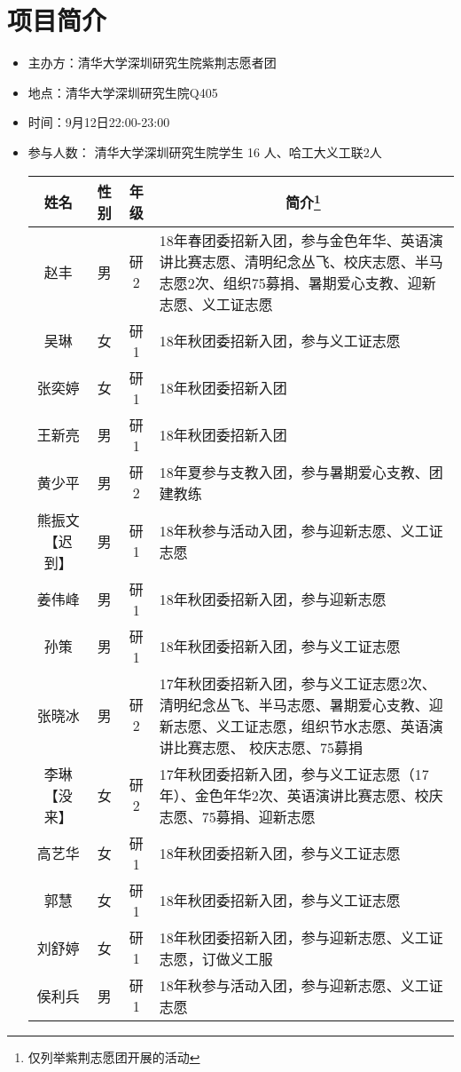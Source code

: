 \documentclass[12pt]{ctexart}
\begin{document}
\section{项目简介}
\begin{itemize}
\item 主办方：清华大学深圳研究生院紫荆志愿者团
\item 地点：清华大学深圳研究生院Q405
\item 时间：9月12日22:00-23:00
\item 参与人数： 清华大学深圳研究生院学生 16 人、哈工大义工联2人
\begin{longtable}{|c|c|c|p{8cm}|}
\hline
姓名 & 性别 & 年级 & \multicolumn{1}{|c|}{简介\footnote{仅列举紫荆志愿团开展的活动}}\\
\hline
赵丰 & 男 & 研2 & 18年春团委招新入团，参与金色年华、英语演讲比赛志愿、清明纪念丛飞、校庆志愿、半马志愿2次、组织75募捐、暑期爱心支教、迎新志愿、义工证志愿\\
\hline
吴琳 & 女 & 研1  & 18年秋团委招新入团，参与义工证志愿\\
\hline
张奕婷 & 女 & 研1 & 18年秋团委招新入团\\
\hline
王新亮 & 男 & 研1 & 18年秋团委招新入团\\
\hline
黄少平 & 男 & 研2 & 18年夏参与支教入团，参与暑期爱心支教、团建教练 \\
\hline
熊振文【迟到】 & 男 & 研1 & 18年秋参与活动入团，参与迎新志愿、义工证志愿 \\
\hline
姜伟峰 & 男 & 研1 & 18年秋团委招新入团，参与迎新志愿 \\
\hline
孙策 & 男 & 研1 & 18年秋团委招新入团，参与义工证志愿 \\
\hline
张晓冰 & 男 & 研2 & 17年秋团委招新入团，参与义工证志愿2次、清明纪念丛飞、半马志愿、暑期爱心支教、迎新志愿、义工证志愿，组织节水志愿、英语演讲比赛志愿、
校庆志愿、75募捐 \\
\hline
李琳【没来】 & 女 & 研2 & 17年秋团委招新入团，参与义工证志愿（17年）、金色年华2次、英语演讲比赛志愿、校庆志愿、75募捐、迎新志愿 \\
\hline
高艺华 & 女 & 研1 & 18年秋团委招新入团，参与义工证志愿 \\
\hline
郭慧 & 女 & 研1 & 18年秋团委招新入团，参与义工证志愿 \\
\hline
刘舒婷 & 女 & 研1 & 18年秋团委招新入团，参与迎新志愿、义工证志愿，订做义工服 \\
\hline
侯利兵 & 男 & 研1 & 18年秋参与活动入团，参与迎新志愿、义工证志愿 \\

\end{longtable}
\end{itemize}
\end{document}
